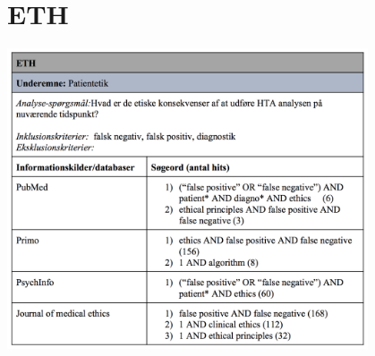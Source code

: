 \section{ETH}\label{ETH_sog}
\begin{center}
\includegraphics[width=0.8\textwidth]{rapportAfsnit/qBilag/sogninger/ETH1}
\end{center}

